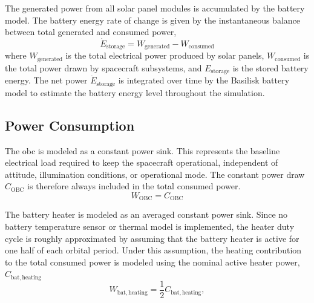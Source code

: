 The generated power from all solar panel modules is accumulated by the battery model. The battery energy rate of change is given by the instantaneous balance between total generated and consumed power,
\begin{equation}
    \dot{E}_{\mathrm{storage}} = W_{\mathrm{generated}} - W_{\mathrm{consumed}}
    \label{eq:eps_balance}
\end{equation}
where $W_{\mathrm{generated}}$ is the total electrical power produced by solar panels, $W_{\mathrm{consumed}}$ is the total power drawn by spacecraft subsystems, and $E_{\mathrm{storage}}$ is the stored battery energy. The net power $\dot{E}_{\mathrm{storage}}$ is integrated over time by the Basilisk battery model to estimate the battery energy level throughout the simulation.




\subsection{Power Consumption}

The \gls{obc} is modeled as a constant power sink. This represents the baseline electrical load required to keep the spacecraft operational, independent of attitude, illumination conditions, or operational mode. The constant power draw $C_{\mathrm{OBC}}$ is therefore always included in the total consumed power.
\begin{equation}
    W_{\mathrm{OBC}} = C_{\mathrm{OBC}}
\end{equation}


The battery heater is modeled as an averaged constant power sink. Since no battery temperature sensor or thermal model is implemented, the heater duty cycle is roughly approximated by assuming that the battery heater is active for one half of each orbital period. Under this assumption, the heating contribution to the total consumed power is modeled using the nominal active heater power, $C_{\mathrm{bat,heating}}$
\begin{equation}
    W_{\mathrm{bat,heating}} = \frac{1}{2} C_{\mathrm{bat,heating}},
\end{equation}


